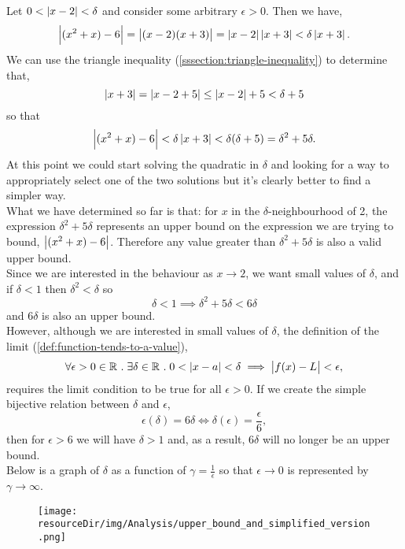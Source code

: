 \documentclass[../MathsNotesBase.tex]{subfiles}
\begin{document}
{\begin{exe}
{				Let ${ 0 < \left\lvert x - 2\right\rvert <\delta }$ and consider some arbitrary ${ \epsilon > 0 }$. Then we have,
				\[ \left\lvert(x^2 + x) - 6\right\rvert = \left\lvert(x - 2)(x + 3)\right\rvert = \left\lvert x - 2\right\rvert\left\lvert x + 3\right\rvert < \delta \left\lvert x + 3\right\rvert. \]
				We can use the triangle inequality (\ref{sssection:triangle-inequality}) to determine that,
				\[ \left\lvert x + 3\right\rvert = \left\lvert x - 2 + 5\right\rvert \leq \left\lvert x - 2\right\rvert + 5 < \delta + 5 \]
				so that
				\[ \left\lvert(x^2 + x) - 6\right\rvert < \delta \left\lvert x + 3\right\rvert < \delta(\delta + 5) = \delta^2 + 5\delta. \]
				At this point we could start solving the quadratic in $\delta$ and looking for a way to appropriately select one of the two solutions but it's clearly better to find a simpler way.\\
				What we have determined so far is that: for $x$ in the $\delta$-neighbourhood of 2, the expression ${ \delta^2 + 5\delta }$ represents an upper bound on the expression we are trying to bound, ${ \left\lvert(x^2 + x) - 6\right\rvert }$. Therefore any value greater than ${ \delta^2 + 5\delta }$ is also a valid upper bound.\\ Since we are interested in the behaviour as ${ x \to 2 }$, we want small values of $\delta$, and if ${ \delta < 1 }$ then ${ \delta^2 <\delta }$ so
				\[ \delta < 1 \implies \delta^2 + 5\delta < 6\delta \]
				and $6\delta$ is also an upper bound.\\
				
				However, although we are interested in small values of $\delta$, the definition of the limit (\ref{def:function-tends-to-a-value}),
				\[ \forall \epsilon > 0 \in \mathbb{R}^{} \;.\; \exists \delta \in \mathbb{R}^{} \;.\; 0 < \left\lvert x - a\right\rvert < \delta \implies \left\lvert f(x) - L\right\rvert < \epsilon, \]
				requires the limit condition to be true for all ${ \epsilon > 0 }$. If we create the simple bijective relation between $\delta$ and $\epsilon$,
				\[ \epsilon(\delta) = 6\delta \iff \delta(\epsilon) = \frac{\epsilon}{6}, \]
				then for ${ \epsilon > 6 }$ we will have ${ \delta > 1 }$ and, as a result, ${ 6\delta }$ will no longer be an upper bound.\\

				Below is a graph of $\delta$ as a function of ${ \gamma = \frac{1}{\epsilon} }$ so that ${ \epsilon \to 0 }$ is represented by ${ \gamma \to \infty }$.
				\begin{figure}[h!]
					\centering
					\texttt{[image: \\resourceDir/img/Analysis/upper\_bound\_and\_simplified\_version.png]}
				\end{figure}
				
}
\end{exe}}
\end{document}
